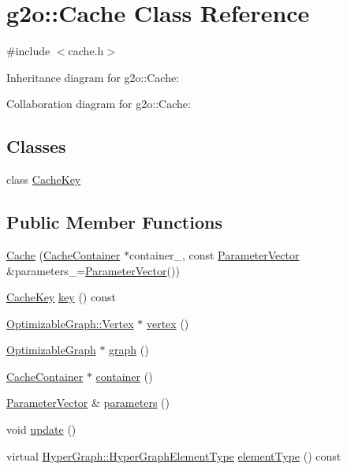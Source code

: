 \hypertarget{classg2o_1_1Cache}{}\section{g2o\+:\+:Cache Class Reference}
\label{classg2o_1_1Cache}


{\ttfamily \#include $<$cache.\+h$>$}



Inheritance diagram for g2o\+:\+:Cache\+:


Collaboration diagram for g2o\+:\+:Cache\+:
\subsection*{Classes}
\begin{DoxyCompactItemize}
\item 
class \hyperlink{classg2o_1_1Cache_1_1CacheKey}{Cache\+Key}
\end{DoxyCompactItemize}
\subsection*{Public Member Functions}
\begin{DoxyCompactItemize}
\item 
\hyperlink{classg2o_1_1Cache_adb5e57e9f06505511fdedb247a977cc3}{Cache} (\hyperlink{classg2o_1_1CacheContainer}{Cache\+Container} $\ast$container\+\_, const \hyperlink{namespaceg2o_a85cc8f2c7db8cab47b2b269a7acd6785}{Parameter\+Vector} \&parameters\+\_\+=\hyperlink{namespaceg2o_a85cc8f2c7db8cab47b2b269a7acd6785}{Parameter\+Vector}())
\item 
\hyperlink{classg2o_1_1Cache_1_1CacheKey}{Cache\+Key} \hyperlink{classg2o_1_1Cache_a12c78ed261c8659c2539b6ebe52aea8f}{key} () const 
\item 
\hyperlink{classg2o_1_1OptimizableGraph_1_1Vertex}{Optimizable\+Graph\+::\+Vertex} $\ast$ \hyperlink{classg2o_1_1Cache_ab94788e39d7e81201d14bc8ac58325c7}{vertex} ()
\item 
\hyperlink{structg2o_1_1OptimizableGraph}{Optimizable\+Graph} $\ast$ \hyperlink{classg2o_1_1Cache_a1a4480a445469d2d02b8db449e6cb57c}{graph} ()
\item 
\hyperlink{classg2o_1_1CacheContainer}{Cache\+Container} $\ast$ \hyperlink{classg2o_1_1Cache_a249ffa5c8ac120b3123bd151200082c9}{container} ()
\item 
\hyperlink{namespaceg2o_a85cc8f2c7db8cab47b2b269a7acd6785}{Parameter\+Vector} \& \hyperlink{classg2o_1_1Cache_a16e471be92f9fe24a3abdf11a0c546d2}{parameters} ()
\item 
void \hyperlink{classg2o_1_1Cache_aaea446a5eb59569acc67c94793975a0b}{update} ()
\item 
virtual \hyperlink{classg2o_1_1HyperGraph_af603119d5d3475aed6e34ee9d701b69e}{Hyper\+Graph\+::\+Hyper\+Graph\+Element\+Type} \hyperlink{classg2o_1_1Cache_a975c586e5a84dd3f4a85f364d5f92f91}{element\+Type} () const 
\end{DoxyCompactItemize}
